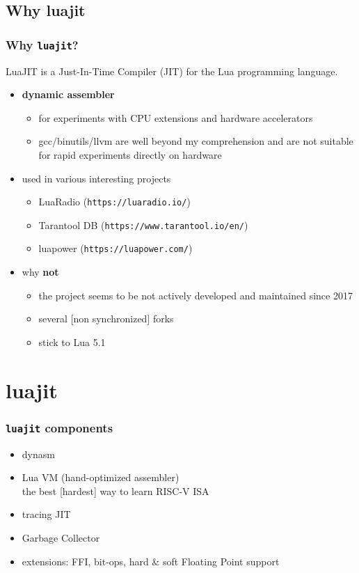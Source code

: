 \subsection{Why luajit}
\begin{frame}
\frametitle{Why \texttt{luajit}?}
LuaJIT is a Just-In-Time Compiler (JIT) for the Lua programming language.

  \begin{itemize}
  \item \textbf{dynamic assembler}
  \begin{itemize}
    \item for experiments with CPU extensions and hardware accelerators
    \item gcc/binutils/llvm are well beyond my comprehension and are
    not suitable for rapid experiments directly on hardware
    \end{itemize}
    \item used in various interesting projects
    \begin{itemize}
    \item LuaRadio (\texttt{https://luaradio.io/})
    \item Tarantool DB (\texttt{https://www.tarantool.io/en/})
    \item luapower (\texttt{https://luapower.com/})
  \end{itemize}

  \item why \textbf{not}
    \begin{itemize}
    \item the project seems to be not actively developed and maintained since 2017
    \item several [non synchronized] forks
    \item stick to Lua 5.1
    \end{itemize}

  \end{itemize}
\end{frame}

\section{luajit}

\begin{frame}
\frametitle{\texttt{luajit} components}
\begin{itemize}
\item dynasm
\item Lua VM (hand-optimized assembler)\\
      the best [hardest] way to learn RISC-V ISA
\item tracing JIT
\item Garbage Collector
\item extensions: FFI, bit-ops, hard \& soft Floating Point support
\end{itemize}
\end{frame}

